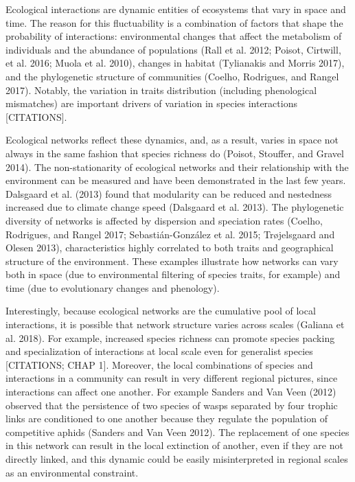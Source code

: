 \documentclass[11pt]{article}
\begin{document}
Ecological interactions are dynamic entities of ecosystems that vary in
space and time. The reason for this fluctuability is a combination of
factors that shape the probability of interactions: environmental
changes that affect the metabolism of individuals and the abundance of
populations (Rall et al. 2012; Poisot, Cirtwill, et al. 2016; Muola et
al. 2010), changes in habitat (Tylianakis and Morris 2017), and the
phylogenetic structure of communities (Coelho, Rodrigues, and Rangel
2017). Notably, the variation in traits distribution (including
phenological mismatches) are important drivers of variation in species
interactions {[}CITATIONS{]}.

Ecological networks reflect these dynamics, and, as a result, varies in
space not always in the same fashion that species richness do (Poisot,
Stouffer, and Gravel 2014). The non-stationarity of ecological networks
and their relationship with the environment can be measured and have
been demonstrated in the last few years. Dalsgaard et al. (2013) found
that modularity can be reduced and nestedness increased due to climate
change speed (Dalsgaard et al. 2013). The phylogenetic diversity of
networks is affected by dispersion and speciation rates (Coelho,
Rodrigues, and Rangel 2017; Sebastián-González et al. 2015; Trøjelsgaard
and Olesen 2013), characteristics highly correlated to both traits and
geographical structure of the environment. These examples illustrate how
networks can vary both in space (due to environmental filtering of
species traits, for example) and time (due to evolutionary changes and
phenology).

Interestingly, because ecological networks are the cumulative pool of
local interactions, it is possible that network structure varies across
scales (Galiana et al. 2018). For example, increased species richness
can promote species packing and specialization of interactions at local
scale even for generalist species {[}CITATIONS; CHAP 1{]}. Moreover, the
local combinations of species and interactions in a community can result
in very different regional pictures, since interactions can affect one
another. For example Sanders and Van Veen (2012) observed that the
persistence of two species of wasps separated by four trophic links are
conditioned to one another because they regulate the population of
competitive aphids (Sanders and Van Veen 2012). The replacement of one
species in this network can result in the local extinction of another,
even if they are not directly linked, and this dynamic could be easily
misinterpreted in regional scales as an environmental constraint.
\end{document}
